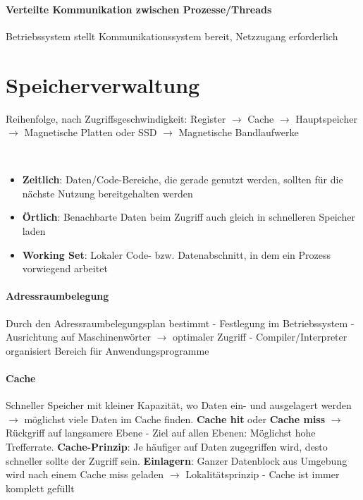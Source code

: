 \documentclass[10pt,a4paper,landscape]{article}
\begin{document}
\begin{multicols*}{3}
	\paragraph{Verteilte Kommunikation zwischen Prozesse/Threads} Betriebssystem stellt Kommunikationssystem bereit, Netzzugang erforderlich
	\section{Speicherverwaltung}
	Reihenfolge, nach Zugriffsgeschwindigkeit: Register $\rightarrow$ Cache $\rightarrow$ Hauptspeicher $\rightarrow$ Magnetische Platten oder SSD $\rightarrow$ Magnetische Bandlaufwerke
	\begin{description}[labelindent=0.0cm]
		\item[Lokalitätsprinzip]~\par
		\begin{itemize}[leftmargin=0.0cm]
			\item \textbf{Zeitlich}: Daten/Code-Bereiche, die gerade genutzt werden, sollten für die nächste Nutzung bereitgehalten werden
			\item \textbf{Örtlich}: Benachbarte Daten beim Zugriff auch gleich in schnelleren Speicher laden
			\item \textbf{Working Set}: Lokaler Code- bzw. Datenabschnitt, in dem ein Prozess vorwiegend arbeitet
		\end{itemize}
	\end{description}
	\paragraph{Adressraumbelegung} Durch den Adressraumbelegungsplan bestimmt - Festlegung im Betriebssystem - Ausrichtung auf Maschinenwörter $\rightarrow$ optimaler Zugriff - Compiler/Interpreter organisiert Bereich für Anwendungsprogramme
	\paragraph{Cache} Schneller Speicher mit kleiner Kapazität, wo Daten ein- und ausgelagert werden $\rightarrow$ möglichst viele Daten im Cache finden. \textbf{Cache hit} oder \textbf{Cache miss} $\rightarrow$ Rückgriff auf langsamere Ebene - Ziel auf allen Ebenen: Möglichst hohe Trefferrate. \textbf{Cache-Prinzip}: Je häufiger auf Daten zugegriffen wird, desto schneller sollte der Zugriff sein. \textbf{Einlagern}: Ganzer Datenblock aus Umgebung wird nach einem Cache miss geladen $\rightarrow$ Lokalitätsprinzip - Cache ist immer komplett gefüllt

\end{multicols*}
\end{document}
